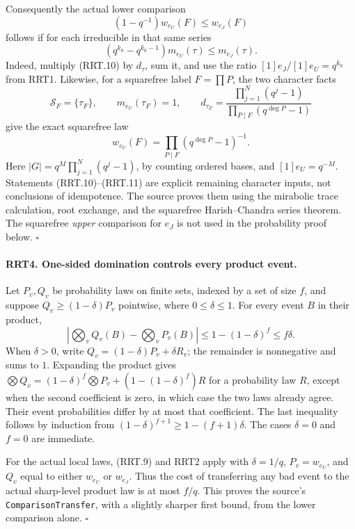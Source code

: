 Consequently the actual lower comparison
\[
       (1-q^{-1})w_{e_U}(F)\le w_{e_J}(F)
 \tag{RRT.9}
\]
follows if for each irreducible in that same series
\[
       (q^{k_0}-q^{k_0-1})m_{e_U}(\tau)\le m_{e_J}(\tau).
 \tag{RRT.10}
\]
Indeed, multiply (RRT.10) by $d_\tau$, sum it, and use the
ratio $[1]e_J/[1]e_U=q^{k_0}$ from RRT1.
Likewise, for a squarefree label $F=\prod P$, the two character
facts
\[
 \mathcal S_F=\{\tau_F\},\qquad
 m_{e_U}(\tau_F)=1,\qquad
 d_{\tau_F}=\frac{\prod_{j=1}^N(q^j-1)}{\prod_{P\mid F}(q^{\deg P}-1)}
 \tag{RRT.11}
\]
give the exact squarefree law
\[
                w_{e_U}(F)=\prod_{P\mid F}(q^{\deg P}-1)^{-1}.
 \tag{RRT.12}
\]
Here $|G|=q^M\prod_{j=1}^N(q^j-1)$, by counting ordered
bases, and $[1]e_U=q^{-M}$.  Statements (RRT.10)--(RRT.11)
are explicit remaining character inputs, not conclusions of
idempotence.  The source proves them using the mirabolic trace
calculation, root exchange, and the squarefree Harish--Chandra
series theorem.  The squarefree \emph{upper} comparison for $e_J$
is not used in the probability proof below.
\hfill$\square$

\paragraph{RRT4. One-sided domination controls every product event.}
\label{claim:RRT4}
Let $P_v,Q_v$ be probability laws on finite sets, indexed by a
set of size $f$, and suppose $Q_v\ge(1-\delta)P_v$ pointwise,
where $0\le\delta\le1$.  For every event $B$ in their product,
\[
 \left|\bigotimes_v Q_v(B)-\bigotimes_v P_v(B)\right|
       \le1-(1-\delta)^f\le f\delta.
 \tag{RRT.13}
\]
When $\delta>0$, write
$Q_v=(1-\delta)P_v+\delta R_v$; the remainder is nonnegative
and sums to $1$.  Expanding the product gives
$\bigotimes Q_v=(1-\delta)^f\bigotimes P_v+
(1-(1-\delta)^f)R$ for a probability law $R$, except when the
second coefficient is zero, in which case the two laws already
agree.  Their event probabilities differ by at most that
coefficient.  The last inequality follows by induction from
$(1-\delta)^{f+1}\ge1-(f+1)\delta$.  The cases $\delta=0$ and
$f=0$ are immediate.

For the actual local laws, (RRT.9) and RRT2 apply with
$\delta=1/q$, $P_v=w_{e_U}$, and $Q_v$ equal to either
$w_{e_U}$ or $w_{e_J}$.  Thus the cost of transferring any bad
event to the actual sharp-level product law is at most $f/q$.
This proves the source's \texttt{ComparisonTransfer}, with a
slightly sharper first bound, from the lower comparison alone.
\hfill$\square$


